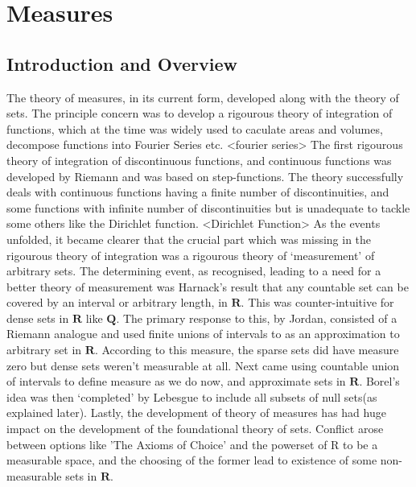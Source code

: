 \chapter{Measures} %

\label{Chapter2} %



\section{Introduction and Overview}
The theory of measures, in its current form, developed along with the theory of
sets.
The principle concern was to develop a rigourous theory of integration of
functions, which at the time was widely used to caculate areas and volumes,
decompose functions into Fourier Series etc.
<fourier series>
\newline
The first rigourous theory of integration of discontinuous functions, and
continuous functions was developed by Riemann and was based on step-functions.
The theory successfully deals with continuous functions having a finite number
of discontinuities, and some functions with infinite number of discontinuities
but is unadequate to tackle some others like the Dirichlet function.
<Dirichlet Function>
\newline
As the events unfolded, it became clearer that the crucial part which was
missing in the rigourous theory of integration was a rigourous theory of
`measurement' of arbitrary sets.
\newline
The determining event, as recognised, leading to a need for a better theory of
measurement was Harnack's result that any countable set can be covered by an
interval or arbitrary length, in $\bm{R}$. This was counter-intuitive for dense
sets in $\bm{R}$ like $\bm{Q}$.
\newline
The primary response to this, by Jordan, consisted of a Riemann analogue and
used finite unions of intervals to as an approximation to arbitrary set in
$\bm{R}$.
According to this measure, the sparse sets did have measure zero but dense sets
weren't measurable at all.
\newline
Next came using countable union of intervals to define measure as we do now, and
approximate sets in $\bm{R}$. Borel's idea was then `completed' by Lebesgue to
include all subsets of null sets(as explained later).
\newline
Lastly, the development of theory of measures has had huge impact on the
development of the foundational theory of sets. Conflict arose between options
like 'The Axioms of Choice' and the powerset of R to be a measurable space, and
the choosing of the former lead to existence of some non-measurable sets in
$\bm{R}$.

